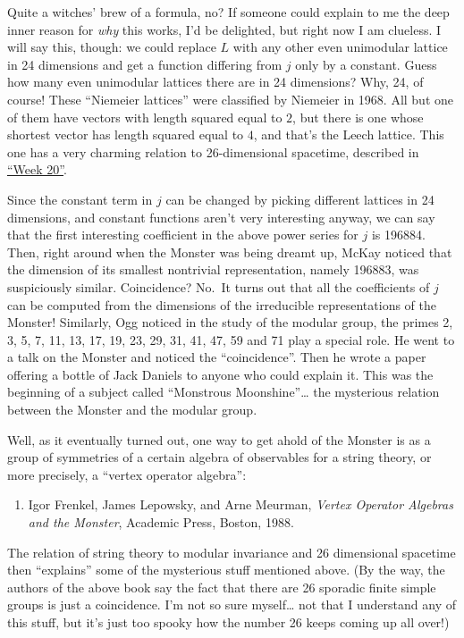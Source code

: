\documentclass{article}
\def\tightlist{}
\begin{document}
Quite a witches' brew of a formula, no? If someone could explain to me
the deep inner reason for \emph{why} this works, I'd be delighted, but
right now I am clueless. I will say this, though: we could replace \(L\)
with any other even unimodular lattice in 24 dimensions and get a
function differing from \(j\) only by a constant. Guess how many even
unimodular lattices there are in 24 dimensions? Why, 24, of course!
These ``Niemeier lattices'' were classified by Niemeier in 1968. All but
one of them have vectors with length squared equal to \(2\), but there
is one whose shortest vector has length squared equal to \(4\), and
that's the Leech lattice. This one has a very charming relation to
26-dimensional spacetime, described in \protect\hyperlink{week20}{``Week
20''}.

Since the constant term in \(j\) can be changed by picking different
lattices in 24 dimensions, and constant functions aren't very
interesting anyway, we can say that the first interesting coefficient in
the above power series for \(j\) is 196884. Then, right around when the
Monster was being dreamt up, McKay noticed that the dimension of its
smallest nontrivial representation, namely 196883, was suspiciously
similar. Coincidence? No.~It turns out that all the coefficients of
\(j\) can be computed from the dimensions of the irreducible
representations of the Monster! Similarly, Ogg noticed in the study of
the modular group, the primes 2, 3, 5, 7, 11, 13, 17, 19, 23, 29, 31,
41, 47, 59 and 71 play a special role. He went to a talk on the Monster
and noticed the ``coincidence''. Then he wrote a paper offering a bottle
of Jack Daniels to anyone who could explain it. This was the beginning
of a subject called ``Monstrous Moonshine''\ldots{} the mysterious
relation between the Monster and the modular group.

Well, as it eventually turned out, one way to get ahold of the Monster
is as a group of symmetries of a certain algebra of observables for a
string theory, or more precisely, a ``vertex operator algebra'':

\begin{enumerate}
\def\labelenumi{\arabic{enumi})}
\setcounter{enumi}{4}
\tightlist
\item
  Igor Frenkel, James Lepowsky, and Arne Meurman, \emph{Vertex Operator
  Algebras and the Monster}, Academic Press, Boston, 1988.
\end{enumerate}

The relation of string theory to modular invariance and 26 dimensional
spacetime then ``explains'' some of the mysterious stuff mentioned
above. (By the way, the authors of the above book say the fact that
there are 26 sporadic finite simple groups is just a coincidence. I'm
not so sure myself\ldots{} not that I understand any of this stuff, but
it's just too spooky how the number 26 keeps coming up all over!)
\end{document}
